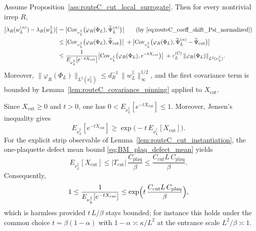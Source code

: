 \begin{lemma}\label{lem:routeC_surrogate_reduction}
Assume Proposition~\ref{ass:routeC_cut_local_surrogate}. Then for every nontrivial irrep $R$,
\begin{align*}
\bigl|\lambda_R(w_L^{(\alpha)})-\lambda_R(w_L^{\parallel})\bigr|
&=\bigl|\mathrm{Cov}_{\nu_L^{\parallel}}\big(\varphi_R(\Phi_L),\widetilde\Psi_L^{(\alpha)}\big)\bigr|
\qquad\text{(by \eqref{eq:routeC_coeff_shift_Psi_normalized})}
\\
&\le \bigl|\mathrm{Cov}_{\nu_L^{\parallel}}\big(\varphi_R(\Phi_L),\widetilde\Psi_{\mathrm{cut}}\big)\bigr|
\;+
\bigl|\mathrm{Cov}_{\nu_L^{\parallel}}\big(\varphi_R(\Phi_L),\widetilde\Psi_L^{(\alpha)}-\widetilde\Psi_{\mathrm{cut}}\big)\bigr|
\\
&\le \frac{1}{E_{\nu_L^{\parallel}}[e^{-tX_{\mathrm{cut}}}]}
\bigl|\mathrm{Cov}_{\nu_L^{\parallel}}\big(\varphi_R(\Phi_L),e^{-tX_{\mathrm{cut}}}\big)\bigr|
\;+
\varepsilon_L^{\mathrm{(C)}}\,\|\varphi_R(\Phi_L)\|_{L^2(\nu_L^{\parallel})}.
\end{align*}
Moreover, $\|\varphi_R(\Phi_L)\|_{L^2(\nu_L^{\parallel})}\le d_R^{-1}\,\|w_L^{\parallel}\|_{\infty}^{1/2}$, and the first covariance term is bounded by Lemma~\ref{lem:routeC_covariance_pinning} applied to $X_{\mathrm{cut}}$.
\end{lemma}

\begin{remark}\label{rem:routeC_surrogate_normalizer}
Since $X_{\mathrm{cut}}\ge 0$ and $t>0$, one has $0<E_{\nu_L^{\parallel}}[e^{-tX_{\mathrm{cut}}}]\le 1$.
Moreover, Jensen's inequality gives
\begin{equation}\label{eq:routeC_surrogate_normalizer_jensen}
E_{\nu_L^{\parallel}}[e^{-tX_{\mathrm{cut}}}]\ge \exp\bigl(-t\,E_{\nu_L^{\parallel}}[X_{\mathrm{cut}}]\bigr).
\end{equation}
For the explicit strip observable of Lemma~\ref{lem:routeC_cut_instantiation}, the one-plaquette defect mean bound \eqref{eq:BM_plaq_defect_mean} yields
\begin{equation}\label{eq:routeC_Xcut_mean_bound}
E_{\nu_L^{\parallel}}[X_{\mathrm{cut}}]\le |T_{\mathrm{cut}}|\,\frac{C_{\mathrm{plaq}}}{\beta}\le \frac{C_{\mathrm{cut}}L\,C_{\mathrm{plaq}}}{\beta}.
\end{equation}
Consequently,
\begin{equation}\label{eq:routeC_surrogate_normalizer_inverse_bound}
1\le \frac{1}{E_{\nu_L^{\parallel}}[e^{-tX_{\mathrm{cut}}}]}
\le \exp\Bigl( t\,\frac{C_{\mathrm{cut}}L\,C_{\mathrm{plaq}}}{\beta}\Bigr),
\end{equation}
which is harmless provided $t\,L/\beta$ stays bounded; for instance this holds under the common choice $t=\beta(1-\alpha)$ with $1-\alpha\asymp \kappa/L^2$ at the entrance scale $L^2/\beta\asymp 1$.
\end{remark}

